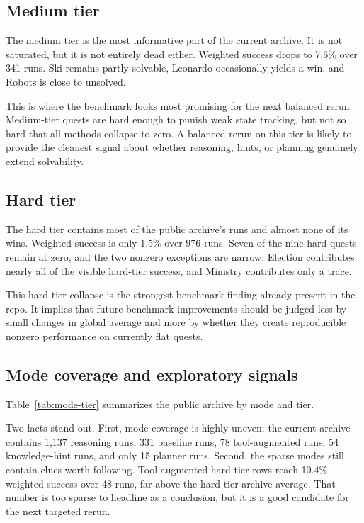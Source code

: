 \documentclass[11pt]{article}
\begin{document}
\subsection{Medium tier}

The medium tier is the most informative part of the current archive. It is not saturated, but it is not entirely dead either. Weighted success drops to 7.6\% over 341 runs. Ski remains partly solvable, Leonardo occasionally yields a win, and Robots is close to unsolved.

This is where the benchmark looks most promising for the next balanced rerun. Medium-tier quests are hard enough to punish weak state tracking, but not so hard that all methods collapse to zero. A balanced rerun on this tier is likely to provide the cleanest signal about whether reasoning, hints, or planning genuinely extend solvability.

\subsection{Hard tier}

The hard tier contains most of the public archive's runs and almost none of its wins. Weighted success is only 1.5\% over 976 runs. Seven of the nine hard quests remain at zero, and the two nonzero exceptions are narrow: Election contributes nearly all of the visible hard-tier success, and Ministry contributes only a trace.

This hard-tier collapse is the strongest benchmark finding already present in the repo. It implies that future benchmark improvements should be judged less by small changes in global average and more by whether they create reproducible nonzero performance on currently flat quests.

\subsection{Mode coverage and exploratory signals}

Table~\ref{tab:mode-tier} summarizes the public archive by mode and tier.

\begin{table}[t]
  \centering
  \caption{Weighted success by public mode label and tier. Each cell reports success and run count.}
  \label{tab:mode-tier}
  
\end{table}

Two facts stand out. First, mode coverage is highly uneven: the current archive contains 1{,}137 reasoning runs, 331 baseline runs, 78 tool-augmented runs, 54 knowledge-hint runs, and only 15 planner runs. Second, the sparse modes still contain clues worth following. Tool-augmented hard-tier rows reach 10.4\% weighted success over 48 runs, far above the hard-tier archive average. That number is too sparse to headline as a conclusion, but it is a good candidate for the next targeted rerun.
\end{document}

